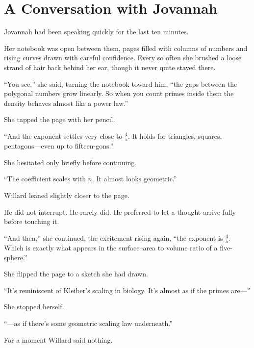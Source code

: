 



\section*{A Conversation with Jovannah}

Jovannah had been speaking quickly for the last ten minutes.

Her notebook was open between them, pages filled with columns of numbers and rising curves drawn with careful confidence. Every so often she brushed a loose strand of hair back behind her ear, though it never quite stayed there.

``You see,'' she said, turning the notebook toward him, ``the gaps between the polygonal numbers grow linearly. So when you count primes inside them the density behaves almost like a power law.''

She tapped the page with her pencil.

``And the exponent settles very close to $\frac{4}{5}$. It holds for triangles, squares, pentagons---even up to fifteen-gons.''

She hesitated only briefly before continuing.

``The coefficient scales with $n$. It almost looks geometric.''

Willard leaned slightly closer to the page.

He did not interrupt. He rarely did. He preferred to let a thought arrive fully before touching it.

``And then,'' she continued, the excitement rising again, ``the exponent is $\frac{4}{5}$. Which is exactly what appears in the surface--area to volume ratio of a five-sphere.''

She flipped the page to a sketch she had drawn.

``It's reminiscent of Kleiber's scaling in biology. It's almost as if the primes are---''

She stopped herself.

``---as if there's some geometric scaling law underneath.''

For a moment Willard said nothing.

